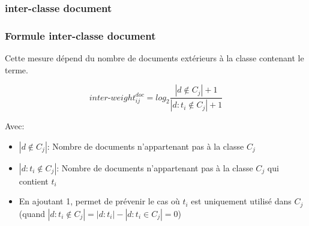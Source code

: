 \documentclass[12pt]{beamer}
\begin{document}
\begin{frame}
\subsubsection*{inter-classe document}
\frametitle{Formule inter-classe document}
Cette mesure dépend du nombre de documents extérieurs à la classe contenant le terme.
 \begin{small}
 

\[ inter\mbox{-}weight_{ij}^{doc} = log_2 \frac{|d \notin{C_j}|+1}{|d:t_i \notin{C_j}|+1}\]
 \end{small}
 Avec:
 \begin{small}
\begin{itemize}
	\item $|d \notin  {C_j}|$: Nombre de documents n'appartenant pas à la classe $C_j$
	\item $|d:t_i \notin {C_j}|$: Nombre de documents n'appartenant pas à la classe $C_j$ qui contient $t_i$ 
	\item En ajoutant 1, permet de prévenir le cas où $t_i$ est uniquement utilisé dans $C_j$ (quand $|d:t_i \notin{C_j}|={|d:t_i|-|d:t_i \in{C_j}|} = 0$)
  \end{itemize}
 \end{small}
\end{frame}  
\end{document}
